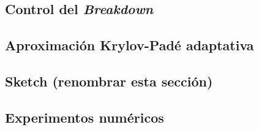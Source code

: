 \subsection{Control del \textit{Breakdown}}

\subsection{Aproximación Krylov-Padé adaptativa}

\subsection{Sketch (renombrar esta sección)}

\subsection{Experimentos numéricos}